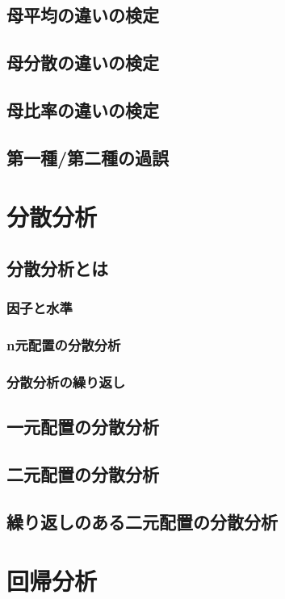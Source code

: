 \documentclass[11pt,a4paper]{jsarticle}                    %
\begin{document}
\subsection{母平均の違いの検定}
\subsection{母分散の違いの検定}
\subsection{母比率の違いの検定}
\subsection{第一種/第二種の過誤}

\section{分散分析}
\subsection{分散分析とは}
\subsubsection{因子と水準}
\subsubsection{n元配置の分散分析}
\subsubsection{分散分析の繰り返し}
\subsection{一元配置の分散分析}
\subsection{二元配置の分散分析}
\subsection{繰り返しのある二元配置の分散分析}
\section{回帰分析}
\end{document}

